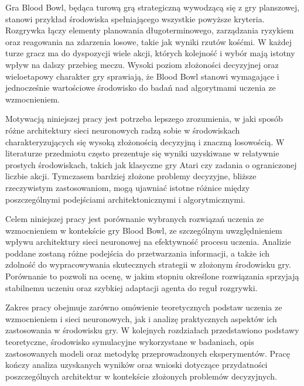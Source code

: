 Gra Blood Bowl, będąca turową grą strategiczną wywodzącą się z gry planszowej, stanowi przykład środowiska spełniającego wszystkie powyższe kryteria. Rozgrywka łączy elementy planowania długoterminowego, zarządzania ryzykiem oraz reagowania na zdarzenia losowe, takie jak wyniki rzutów kośćmi. W każdej turze gracz ma do dyspozycji wiele akcji, których kolejność i wybór mają istotny wpływ na dalszy przebieg meczu. Wysoki poziom złożoności decyzyjnej oraz wieloetapowy charakter gry sprawiają, że Blood Bowl stanowi wymagające i jednocześnie wartościowe środowisko do badań nad algorytmami uczenia ze wzmocnieniem.

Motywacją niniejszej pracy jest potrzeba lepszego zrozumienia, w jaki sposób różne architektury sieci neuronowych radzą sobie w środowiskach charakteryzujących się wysoką złożonością decyzyjną i znaczną losowością. W literaturze przedmiotu często prezentuje się wyniki uzyskiwane w relatywnie prostych środowiskach, takich jak klasyczne gry Atari czy zadania o ograniczonej liczbie akcji. Tymczasem bardziej złożone problemy decyzyjne, bliższe rzeczywistym zastosowaniom, mogą ujawniać istotne różnice między poszczególnymi podejściami architektonicznymi i algorytmicznymi.

Celem niniejszej pracy jest porównanie wybranych rozwiązań uczenia ze wzmocnieniem w kontekście gry Blood Bowl, ze szczególnym uwzględnieniem wpływu architektury sieci neuronowej na efektywność procesu uczenia. Analizie poddane zostaną różne podejścia do przetwarzania informacji, a także ich zdolność do wypracowywania skutecznych strategii w złożonym środowisku gry. Porównanie to pozwoli na ocenę, w jakim stopniu określone rozwiązania sprzyjają stabilnemu uczeniu oraz szybkiej adaptacji agenta do reguł rozgrywki.

Zakres pracy obejmuje zarówno omówienie teoretycznych podstaw uczenia ze wzmocnieniem i sieci neuronowych, jak i analizę praktycznych aspektów ich zastosowania w środowisku gry. W kolejnych rozdziałach przedstawiono podstawy teoretyczne, środowisko symulacyjne wykorzystane w badaniach, opis zastosowanych modeli oraz metodykę przeprowadzonych eksperymentów. Pracę kończy analiza uzyskanych wyników oraz wnioski dotyczące przydatności poszczególnych architektur w kontekście złożonych problemów decyzyjnych.